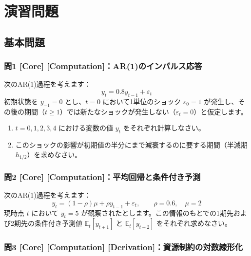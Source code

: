 \documentclass[
  japanese,
  lualatex,
  ja=standard,
  12pt,
  a4paper]{ltjsarticle}
\providecommand{\tightlist}{%
  \setlength{\itemsep}{0pt}\setlength{\parskip}{0pt}}
\begin{document}
\section{演習問題}\label{ux6f14ux7fd2ux554fux984c}

\subsection{基本問題}\label{ux57faux672cux554fux984c}

\subsubsection{問1 {[}Core{]}
{[}Computation{]}：AR(1)のインパルス応答}\label{ux554f1-core-computationar1ux306eux30a4ux30f3ux30d1ux30ebux30b9ux5fdcux7b54}

次のAR(1)過程を考えます： \[
y_t=0.8y_{t-1}+\varepsilon_t
\] 初期状態を \(y_{-1}=0\) とし、\(t=0\) において1単位のショック
\(\varepsilon_0=1\)
が発生し、その後の期間（\(t\geq 1\)）では新たなショックが発生しない（\(\varepsilon_t=0\)）と仮定します。

\begin{enumerate}
\def\labelenumi{\arabic{enumi}.}
\tightlist
\item
  \(t=0, 1, 2, 3, 4\) における変数の値 \(y_t\) をそれぞれ計算しなさい。
\item
  このショックの影響が初期値の半分にまで減衰するのに要する期間（半減期
  \(h_{1/2}\)）を求めなさい。
\end{enumerate}

\subsubsection{問2 {[}Core{]}
{[}Computation{]}：平均回帰と条件付き予測}\label{ux554f2-core-computationux5e73ux5747ux56deux5e30ux3068ux6761ux4ef6ux4ed8ux304dux4e88ux6e2c}

次のAR(1)過程を考えます： \[
y_t=(1-\rho)\mu+\rho y_{t-1}+\varepsilon_t,
\qquad
\rho=0.6,\quad \mu=2
\] 現時点 \(t\) において \(y_t=5\)
が観察されたとします。この情報のもとでの1期先および2期先の条件付き予測値
\(\mathbb{E}_t[y_{t+1}]\) と \(\mathbb{E}_t[y_{t+2}]\)
をそれぞれ求めなさい。

\subsubsection{問3 {[}Core{]} {[}Computation{]}
{[}Derivation{]}：資源制約の対数線形化}\label{ux554f3-core-computation-derivationux8cc7ux6e90ux5236ux7d04ux306eux5bfeux6570ux7ddaux5f62ux5316}
\end{document}
